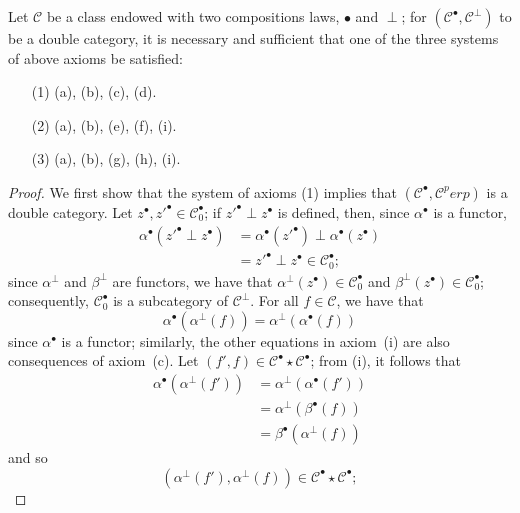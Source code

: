 \documentclass[a4paper,fleqn]{article}
\theoremstyle{plain}
\newenvironment{theorem}[1]
  {\renewcommand\theinnertheorem{#1}\innertheorem}
  {\endinnertheorem}
\theoremstyle{definition}
\newcommand{\oldpage}[1]{{\marginpar{\footnotesize$\bigg\vert$\,\,\,\,\textit{p.~#1}}}}
\newcommand{\CC}{\mathcal{C}}
\newcommand{\smallbullet}{\bullet}
\begin{document}
\begin{theorem}{5}
\label{theorem:ii-5}
  Let $\CC$ be a class endowed with two compositions laws, $\smallbullet$ and $\perp$;
  for $(\CC^\smallbullet,\CC^\perp)$ to be a double category, it is necessary and sufficient that one of the three systems of above axioms be satisfied:
  \begin{enumerate}
    \item[\normalfont(1)]
      (a), (b), (c), (d).
    \item[\normalfont(2)]
      (a), (b), (e), (f), (i).
    \item[\normalfont(3)]
      (a), (b), (g), (h), (i).
  \end{enumerate}
\end{theorem}

\begin{proof}
  We first show that the system of axioms (1) implies that $(\CC^\smallbullet,\CC^perp)$ is a double category.
  Let $z^\smallbullet,z'^\smallbullet\in\CC_0^\smallbullet$;
  if $z'^\smallbullet\perp z^\smallbullet$ is defined, then, since $\alpha^\smallbullet$ is a functor,
  \[
    \begin{aligned}
      \alpha^\smallbullet(z'^\smallbullet\perp z^\smallbullet)
      &= \alpha^\smallbullet(z'^\smallbullet)\perp\alpha^\smallbullet(z^\smallbullet)
    \\&= z'^\smallbullet\perp z^\smallbullet
    \in \CC_0^\smallbullet;
    \end{aligned}
  \]
  since $\alpha^\perp$ and $\beta^\perp$ are functors, we have that $\alpha^\perp(z^\smallbullet)\in\CC_0^\smallbullet$ and $\beta^\perp(z^\smallbullet)\in\CC_0^\smallbullet$;
  consequently, $\CC_0^\smallbullet$ is a subcategory of $\CC^\perp$.
  For all $f\in\CC$, we have that
  \[
    \alpha^\smallbullet(\alpha^\perp(f))=\alpha^\perp(\alpha^\smallbullet(f))
  \]
  since $\alpha^\smallbullet$ is a functor;
  similarly, the other equations in axiom~(i) are also consequences of axiom~(c).
  Let $(f',f)\in\CC^\smallbullet\star\CC^\smallbullet$;
  from (i), it follows that
  \[
    \begin{aligned}
      \alpha^\smallbullet(\alpha^\perp(f'))
      &= \alpha^\perp(\alpha^\smallbullet(f'))
    \\&= \alpha^\perp(\beta^\smallbullet(f))
    \\&= \beta^\smallbullet(\alpha^\perp(f))
    \end{aligned}
  \]
  \oldpage{392}
  and so
  \[
    (\alpha^\perp(f'),\alpha^\perp(f))\in\CC^\smallbullet\star\CC^\smallbullet;
\]
\end{proof}
\end{document}

